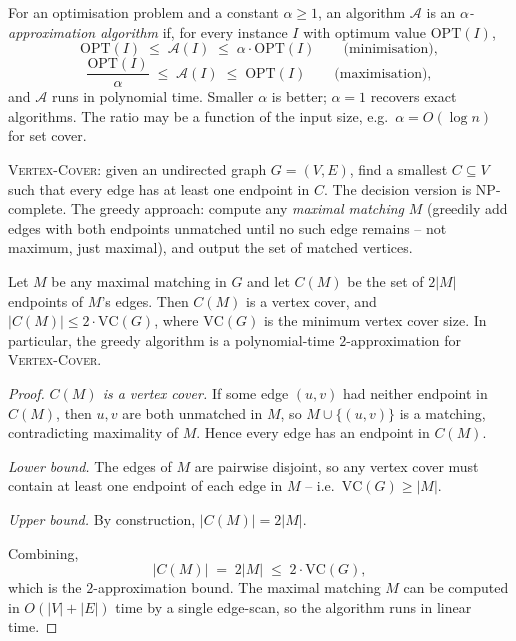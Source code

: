\begin{definition}
\label{def:approximation_ratio}
For an optimisation problem and a constant $\alpha \ge 1$, an algorithm $\mathcal{A}$ is an \emph{$\alpha$-approximation algorithm} if, for every instance $I$ with optimum value $\mathrm{OPT}(I)$,
\[
  \mathrm{OPT}(I) \;\le\; \mathcal{A}(I) \;\le\; \alpha \cdot \mathrm{OPT}(I) \qquad \text{(minimisation)},
\]
\[
  \frac{\mathrm{OPT}(I)}{\alpha} \;\le\; \mathcal{A}(I) \;\le\; \mathrm{OPT}(I) \qquad \text{(maximisation)},
\]
and $\mathcal{A}$ runs in polynomial time. Smaller $\alpha$ is better; $\alpha = 1$ recovers exact algorithms. The ratio may be a function of the input size, e.g.\ $\alpha = O(\log n)$ for set cover.
\end{definition}

\begin{example}
\label{ex:vc_setup}
\textsc{Vertex-Cover}: given an undirected graph $G=(V,E)$, find a smallest $C \subseteq V$ such that every edge has at least one endpoint in $C$. The decision version is NP-complete. The greedy approach: compute any \emph{maximal matching} $M$ (greedily add edges with both endpoints unmatched until no such edge remains -- not maximum, just maximal), and output the set of matched vertices.
\end{example}

\begin{theorem}
\label{thm:vc_2approx}
Let $M$ be any maximal matching in $G$ and let $C(M)$ be the set of $2|M|$ endpoints of $M$'s edges. Then $C(M)$ is a vertex cover, and $|C(M)| \le 2 \cdot \mathrm{VC}(G)$, where $\mathrm{VC}(G)$ is the minimum vertex cover size. In particular, the greedy algorithm is a polynomial-time $2$-approximation for \textsc{Vertex-Cover}.
\end{theorem}

\begin{proof}
\textit{$C(M)$ is a vertex cover.} If some edge $(u,v)$ had neither endpoint in $C(M)$, then $u, v$ are both unmatched in $M$, so $M \cup \{(u,v)\}$ is a matching, contradicting maximality of $M$. Hence every edge has an endpoint in $C(M)$.

\medskip
\noindent\textit{Lower bound.} The edges of $M$ are pairwise disjoint, so any vertex cover must contain at least one endpoint of each edge in $M$ -- i.e.\ $\mathrm{VC}(G) \ge |M|$.

\medskip
\noindent\textit{Upper bound.} By construction, $|C(M)| = 2|M|$.

\medskip
\noindent Combining,
\[
  |C(M)| \;=\; 2|M| \;\le\; 2 \cdot \mathrm{VC}(G),
\]
which is the $2$-approximation bound. The maximal matching $M$ can be computed in $O(|V|+|E|)$ time by a single edge-scan, so the algorithm runs in linear time.
\end{proof}

